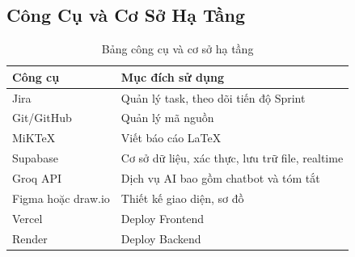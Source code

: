 \subsection{Công Cụ và Cơ Sở Hạ Tầng}

\begin{table}[H]
  \centering
  \begin{tabularx}{\textwidth}{|l|X|}
    \hline
    \textbf{Công cụ} & \textbf{Mục đích sử dụng} \\
    \hline
    Jira & Quản lý task, theo dõi tiến độ Sprint \\ \hline
    Git/GitHub & Quản lý mã nguồn \\ \hline
    MiKTeX & Viết báo cáo LaTeX \\ \hline
    Supabase & Cơ sở dữ liệu, xác thực, lưu trữ file, realtime \\ \hline
    Groq API & Dịch vụ AI bao gồm chatbot và tóm tắt \\ \hline
    Figma hoặc draw.io & Thiết kế giao diện, sơ đồ \\ \hline
    Vercel & Deploy Frontend \\ \hline
    Render & Deploy Backend \\
    \hline
  \end{tabularx}
  \caption{Bảng công cụ và cơ sở hạ tầng}
  \label{tab:tools}
\end{table}
